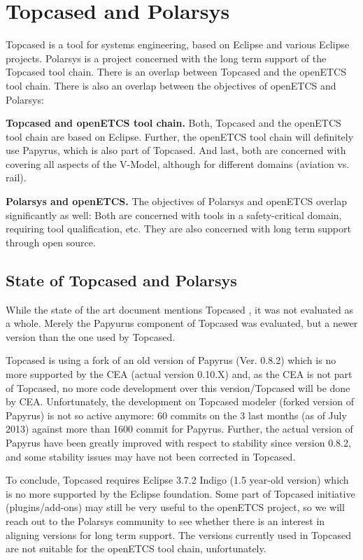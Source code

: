 \section{Topcased and Polarsys}

Topcased is a tool for systems engineering, based on Eclipse and various Eclipse projects.  Polarsys is a project concerned with the long term support of the Topcased tool chain.  There is an overlap between Topcased and the openETCS tool chain.  There is also an overlap between the objectives of openETCS and Polarsys:

\textbf{Topcased and openETCS tool chain.} Both, Topcased and the openETCS tool chain are based on Eclipse.  Further, the openETCS tool chain will definitely use Papyrus, which is also part of Topcased.  And last, both are concerned with covering all aspects of the V-Model, although for different domains (aviation vs. rail).

\textbf{Polarsys and openETCS.}  The objectives of Polarsys and openETCS overlap significantly as well: Both are concerned with tools in a safety-critical domain, requiring tool qualification, etc.  They are also concerned with long term support through open source.

\subsection{State of Topcased and Polarsys}

While the state of the art document mentions Topcased \cite{}, it was not evaluated as a whole.  Merely the Papyurus component of Topcased was evaluated, but a newer version than the one used by Topcased.

Topcased is using a fork of an old version of Papyrus (Ver. 0.8.2) which is no more supported by the CEA (actual version 0.10.X) and, as the CEA is not part of Topcased, no more code development over this version/Topcased will be done by CEA.  Unfortunately, the development on Topcased modeler (forked version of Papyrus) is not so active anymore: 60 commits on the 3 last months (as of July 2013) against more than 1600 commit for Papyrus.  Further, the actual version of Papyrus have been greatly improved with respect to stability since version 0.8.2, and some stability issues may have not been corrected in Topcased.

To conclude, Topcased requires Eclipse 3.7.2 Indigo (1.5 year-old version) which is no more supported by the Eclipse foundation.  Some part of Topcased initiative (plugins/add-ons) may still be very useful to the openETCS project, so we will reach out to the Polarsys community to see whether there is an interest in aligning versions for long term support.  The versions currently used in Topcased are not suitable for the openETCS tool chain, unfortunately.

